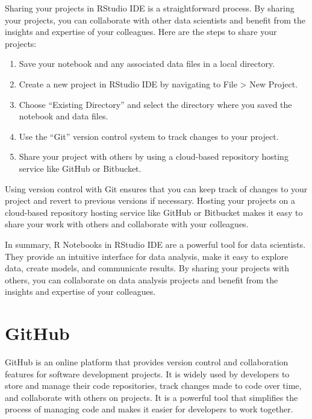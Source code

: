 \documentclass[
]{book}
\providecommand{\tightlist}{%
  \setlength{\itemsep}{0pt}\setlength{\parskip}{0pt}}
\begin{document}
Sharing your projects in RStudio IDE is a straightforward process. By sharing your projects, you can collaborate with other data scientists and benefit from the insights and expertise of your colleagues. Here are the steps to share your projects:

\begin{enumerate}
\def\labelenumi{\arabic{enumi}.}
\tightlist
\item
  Save your notebook and any associated data files in a local directory.
\item
  Create a new project in RStudio IDE by navigating to File \textgreater{} New Project.
\item
  Choose ``Existing Directory'' and select the directory where you saved the notebook and data files.
\item
  Use the ``Git'' version control system to track changes to your project.
\item
  Share your project with others by using a cloud-based repository hosting service like GitHub or Bitbucket.
\end{enumerate}

Using version control with Git ensures that you can keep track of changes to your project and revert to previous versions if necessary. Hosting your projects on a cloud-based repository hosting service like GitHub or Bitbucket makes it easy to share your work with others and collaborate with your colleagues.

In summary, R Notebooks in RStudio IDE are a powerful tool for data scientists. They provide an intuitive interface for data analysis, make it easy to explore data, create models, and communicate results. By sharing your projects with others, you can collaborate on data analysis projects and benefit from the insights and expertise of your colleagues.

\hypertarget{github}{%
\section{GitHub}\label{github}}

GitHub is an online platform that provides version control and collaboration features for software development projects. It is widely used by developers to store and manage their code repositories, track changes made to code over time, and collaborate with others on projects. It is a powerful tool that simplifies the process of managing code and makes it easier for developers to work together.
\end{document}
